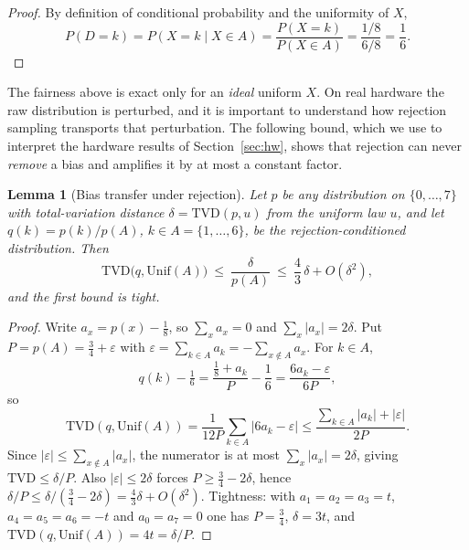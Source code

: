\documentclass{ieeeaccess}
\newtheorem{lemma}{Lemma}
\begin{document}
\begin{proof}
By definition of conditional probability and the uniformity of $X$,
\begin{equation}
P(D=k) = P(X=k\mid X\in A) = \frac{P(X=k)}{P(X\in A)} = \frac{1/8}{6/8} = \frac{1}{6}.
\end{equation}
\end{proof}

The fairness above is exact only for an \emph{ideal} uniform $X$. On real hardware the raw distribution is perturbed, and it is important to understand how rejection sampling transports that perturbation. The following bound, which we use to interpret the hardware results of Section~\ref{sec:hw}, shows that rejection can never \emph{remove} a bias and amplifies it by at most a constant factor.

\begin{lemma}[Bias transfer under rejection]\label{lem:transfer}
Let $p$ be any distribution on $\{0,\dots,7\}$ with total-variation distance $\delta=\mathrm{TVD}(p,u)$ from the uniform law $u$, and let $q(k)=p(k)/p(A)$, $k\in A=\{1,\dots,6\}$, be the rejection-conditioned distribution. Then
\begin{equation}
\mathrm{TVD}\bigl(q,\mathrm{Unif}(A)\bigr)\ \le\ \frac{\delta}{p(A)}\ \le\ \frac{4}{3}\,\delta+O(\delta^2),
\end{equation}
and the first bound is tight.
\end{lemma}

\begin{proof}
Write $a_x=p(x)-\tfrac18$, so $\sum_x a_x=0$ and $\sum_x|a_x|=2\delta$. Put $P=p(A)=\tfrac34+\varepsilon$ with $\varepsilon=\sum_{k\in A}a_k=-\sum_{x\notin A}a_x$. For $k\in A$,
\begin{equation}
q(k)-\tfrac16=\frac{\tfrac18+a_k}{P}-\frac16=\frac{6a_k-\varepsilon}{6P},
\end{equation}
so
\begin{equation}
\mathrm{TVD}(q,\mathrm{Unif}(A))=\frac{1}{12P}\sum_{k\in A}\lvert 6a_k-\varepsilon\rvert\le\frac{\sum_{k\in A}|a_k|+|\varepsilon|}{2P}.
\end{equation}
Since $|\varepsilon|\le\sum_{x\notin A}|a_x|$, the numerator is at most $\sum_x|a_x|=2\delta$, giving $\mathrm{TVD}\le\delta/P$. Also $|\varepsilon|\le 2\delta$ forces $P\ge\tfrac34-2\delta$, hence $\delta/P\le\delta/(\tfrac34-2\delta)=\tfrac43\delta+O(\delta^2)$. Tightness: with $a_1=a_2=a_3=t$, $a_4=a_5=a_6=-t$ and $a_0=a_7=0$ one has $P=\tfrac34$, $\delta=3t$, and $\mathrm{TVD}(q,\mathrm{Unif}(A))=4t=\delta/P$.
\end{proof}
\end{document}
